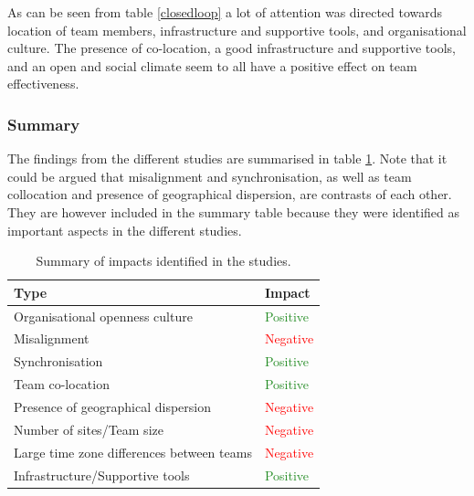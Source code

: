 As can be seen from table \ref{closedloop} a lot of attention was directed towards location of team members, infrastructure and supportive tools, and organisational culture. The presence of co-location, a good infrastructure and supportive tools, and an open and social climate seem to all have a positive effect on team effectiveness.

\subsubsection{Summary}

The findings from the different studies are summarised in table \ref{summary}. Note that it could be argued that misalignment and synchronisation, as well as team collocation and presence of geographical dispersion, are contrasts of each other. They are however included in the summary table because they were identified as important aspects in the different studies.

\begin{table}[H]
\begin{center}
    \begin{tabular}{ | p{8cm} | p{6cm} |}
    \hline
    \textbf{Type} & \textbf{Impact} \\ \hline
    Organisational openness culture & \textcolor{ForestGreen}{Positive} \\ \hline
    Misalignment & \textcolor{red}{Negative} \\ \hline
    Synchronisation & \textcolor{ForestGreen}{Positive} \\ \hline
    Team co-location & \textcolor{ForestGreen}{Positive} \\ \hline
    Presence of geographical dispersion & \textcolor{red}{Negative} \\ \hline
    Number of sites/Team size & \textcolor{red}{Negative} \\ \hline
    Large time zone differences between teams & \textcolor{red}{Negative} \\ \hline
    Infrastructure/Supportive tools & \textcolor{ForestGreen}{Positive} \\ \hline
    \end{tabular}
    \caption{Summary of impacts identified in the studies.}
    \label{summary}
\end{center}
\end{table}